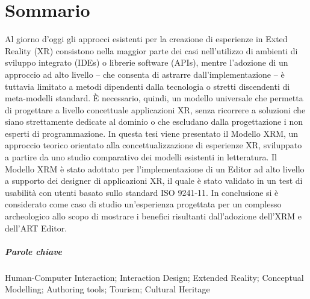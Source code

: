 \chapter{Sommario}
Al giorno d'oggi gli approcci esistenti per la creazione di esperienze in Exted Reality (XR) consistono nella maggior parte dei casi nell'utilizzo di ambienti di sviluppo integrato (IDEs) o librerie software (APIs), mentre l'adozione di un approccio ad alto livello -- che consenta di astrarre dall'implementazione -- è tuttavia limitato a metodi dipendenti dalla tecnologia o stretti discendenti di meta-modelli standard.
È necessario, quindi, un modello universale che permetta di progettare a livello concettuale applicazioni XR, senza ricorrere a soluzioni che siano strettamente dedicate al dominio o che escludano dalla progettazione i non esperti di programmazione. In questa tesi viene presentato il Modello XRM, un approccio teorico orientato alla concettualizzazione di esperienze XR, sviluppato a partire da uno studio comparativo dei modelli esistenti in letteratura. Il Modello XRM è stato adottato per l'implementazione di un Editor ad alto livello a supporto dei designer di applicazioni XR, il quale è stato validato in un test di usabilità con utenti basato sullo standard ISO 9241-11. In conclusione si è considerato come caso di studio un'esperienza progettata per un complesso archeologico allo scopo di mostrare i benefici risultanti dall'adozione dell'XRM e dell'ART Editor.


\paragraph{Parole chiave} Human-Computer Interaction; Interaction Design; Extended Reality; Conceptual Modelling; Authoring tools; Tourism; Cultural Heritage
